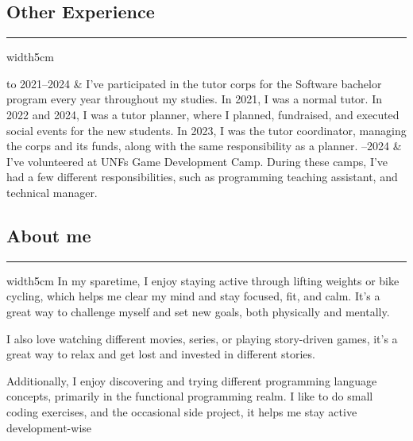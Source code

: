 \documentclass[a4paper]{report}
\def\secsep{\hrule width5cm}
\begin{document}
\subsection*{Other Experience}
\secsep
\begin{longtabu} to 
2021--2024 & 
    I've participated in the tutor corps for the Software bachelor program every year throughout my studies.
    In 2021, I was a normal tutor.
    In 2022 and 2024, I was a tutor planner, where I planned, fundraised, and executed social events for the new students.
    In 2023, I was the tutor coordinator, managing the corps and its funds, along with the same responsibility as a planner.
--2024 & 
    I've volunteered at UNFs Game Development Camp.
    During these camps, I've had a few different responsibilities, such as programming teaching assistant, and technical manager.
\end{longtabu}

\subsection*{About me}
\secsep
\setlength{\parskip}{1ex}
In my sparetime, I enjoy staying active through lifting weights or bike cycling, which helps me clear my mind and stay focused, fit, and calm.
It’s a great way to challenge myself and set new goals, both physically and mentally.\par

\noindent
I also love watching different movies, series, or playing story-driven games, it’s a great way to relax and get lost and invested in different stories.

\noindent
Additionally, I enjoy discovering and trying different programming language concepts, primarily in the functional programming realm.
I like to do small coding exercises, and the occasional side project, it helps me stay active development-wise
\end{document}
